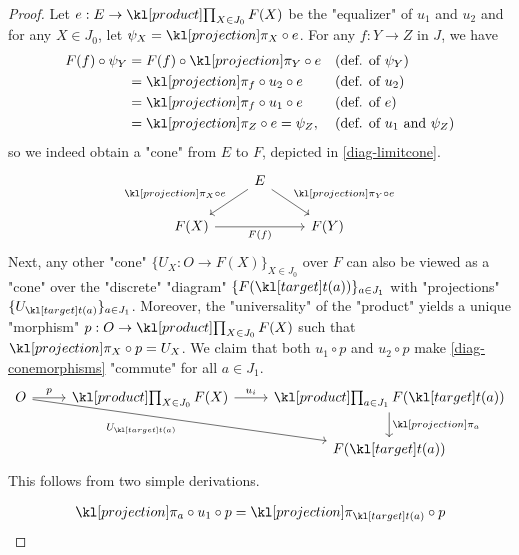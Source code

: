 \documentclass[main.tex]{subfiles}
\begin{document}
\begin{proof}
    Let $e:E\rightarrow \Product_{X\in J_0} F(X)$ be the "equalizer" of $u_1$ and $u_2$ and for any $X \in J_0$, let $\psi_X = \projection_X \circ e$. For any $f: Y \rightarrow Z$ in $J$, we have 
    \begin{align*}
        F(f) \circ \psi_Y &= F(f) \circ \projection_Y \circ e &&\mbox{(def. of $\psi_Y$)}\\ 
        &= \projection_f \circ u_2 \circ e &&\mbox{(def. of $u_2$)}\\ 
        &= \projection_f \circ u_1 \circ e &&\mbox{(def. of $e$)}\\
        &= \projection_Z \circ e = \psi_Z, &&\mbox{(def. of $u_1$ and $\psi_Z$)}
    \end{align*}
    so we indeed obtain a "cone" from $E$ to $F$, depicted in \eqref{diag-limitcone}.
    \begin{equation}\label{diag-limitcone}
        \begin{tikzcd}
            & E \arrow[ld, "\projection_X \circ e"'] \arrow[rd, "\projection_Y \circ e"] &      \\
            F(X) \arrow[rr, "F(f)"'] & & F(Y)
        \end{tikzcd}
    \end{equation}
    Next, any other "cone" $\{U_X: O \rightarrow F(X)\}_{X \in J_0}$ over $F$ can also be viewed as a "cone" over the "discrete" "diagram" $\{F(\target(a))\}_{a \in J_1}$ with "projections" $\{U_{\target(a)}\}_{a \in J_1}$. Moreover, the "universality" of the "product" yields a unique "morphism" $p: O\rightarrow \Product_{X \in J_0} F(X)$ such that $\projection_X \circ p = U_X$. We claim that both $u_1 \circ p$ and $u_2 \circ p$ make \eqref{diag-conemorphisms} "commute" for all $a \in J_1$.
    \begin{equation}\label{diag-conemorphisms}
        \begin{tikzcd}
            O \arrow[r, "p"] \arrow[rrd, "U_{\target(a)}"'] &\Product_{X \in J_0} F(X) \arrow[r, "u_i"] & \Product_{a \in J_1} F(\target(a)) \arrow[d, "\projection_a"] \\
             & & F(\target(a))
            \end{tikzcd}
    \end{equation}
    This follows from two simple derivations.\\
    \begin{minipage}{0.49\textwidth}
    \begin{align*}
        \projection_a \circ u_1 \circ p &= \projection_{\target(a)} \circ p\\

\end{align*}
\end{minipage}
\end{proof}
\end{document}
